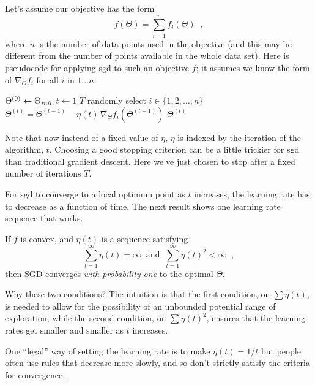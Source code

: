 Let's assume our objective has the form
\[
  f(\Theta) = \sum_{i = 1}^n f_i(\Theta)
  \;\;,
\]
where $n$ is the number of data points used in the objective (and this
may be different from the number of points available in the whole data
set).  Here is pseudocode for applying {\sc sgd} to such an objective $f$;
it assumes we know the form of $\nabla_\Theta f_i$ for all $i$ in
$1\ldots n$:
\begin{codebox}
  \li $\Theta^{(0)} \gets \Theta_{\it init}$
  \li \For $t \gets 1$ \To $T$
  \li \Do
  randomly select $i \in \{1, 2, \dots, n\}$
  \li   $\Theta^{(t)} = \Theta^{(t-1)} - \eta(t) \, \nabla_\Theta f_i(\Theta^{(t-1)})$
  \End
  \li \Return $\Theta^{(t)}$
\end{codebox}

Note that now instead of a fixed  value of $\eta$, $\eta$ is indexed by
the iteration of the algorithm, $t$.
Choosing a good stopping criterion can be a little trickier for {\sc sgd} than
traditional gradient descent. Here we've just chosen
to stop after a fixed number of iterations $T$.

For {\sc sgd} to converge to a local optimum point as $t$ increases, the
learning rate has to decrease as a function of time. The next result shows one
learning rate sequence that works.

\begin{theorem}
  If $f$ is convex, and $\eta(t)$ is a sequence satisfying
  $$ \sum_{t = 1}^{\infty}\eta(t) = \infty \;\;\text{and}\;\;
    \sum_{t = 1}^{\infty}\eta(t)^2 < \infty \;\;,$$
  then SGD converges {\em with probability one}%
  to the optimal $\Theta$.
\end{theorem}

Why these two conditions?  The intuition is that the first condition,
on $\sum \eta(t)$, is needed to allow for the possibility of an
unbounded potential range of exploration, while the second condition,
on $\sum\eta(t)^2$, ensures that the learning rates get smaller and
smaller as $t$ increases.

One ``legal'' way of setting the learning rate is to make $\eta(t) = 1/t$ but
people often use rules that decrease more slowly, and so don't
strictly satisfy the criteria for convergence.

